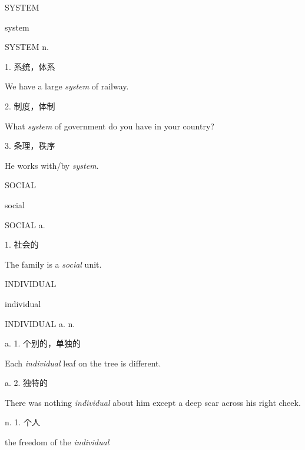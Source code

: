 \begin{flashcard}{
SYSTEM

system
}
\begin{center}
SYSTEM n. 
\end{center}
1. 系统，体系

We have a large \textit{system} of railway.

2. 制度，体制

What \textit{system} of government do you have in your country?

3. 条理，秩序

He works with/by \textit{system}.

\end{flashcard}
\begin{flashcard}{
SOCIAL

social
}
\begin{center}
SOCIAL a. 
\end{center}
1. 社会的

The family is a \textit{social} unit.

\end{flashcard}
\begin{flashcard}{
INDIVIDUAL

individual
}
\begin{center}
INDIVIDUAL a. n. 
\end{center}
a. 1. 个别的，单独的

Each \textit{individual} leaf on the tree is different.

a. 2. 独特的

There was nothing \textit{individual} about him except a deep scar across his right cheek.

n. 1. 个人

the freedom of the \textit{individual}

\end{flashcard}

